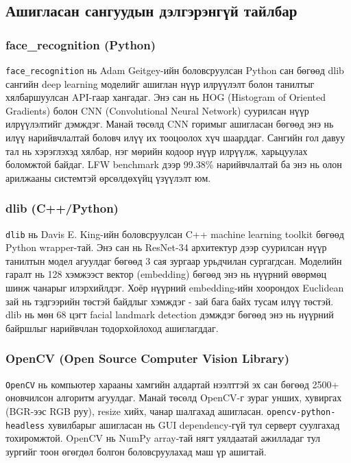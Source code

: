 \documentclass[12pt,a4paper]{article}
\begin{document}
\subsection{Ашигласан сангуудын дэлгэрэнгүй тайлбар}

\subsubsection{face\_recognition (Python)}

\texttt{face\_recognition} нь Adam Geitgey-ийн боловсруулсан Python сан бөгөөд dlib сангийн deep learning моделийг ашиглан нүүр илрүүлэлт болон танилтыг хялбаршуулсан API-гаар хангадаг. Энэ сан нь HOG (Histogram of Oriented Gradients) болон CNN (Convolutional Neural Network) суурилсан нүүр илрүүлэлтийг дэмждэг. Манай төсөлд CNN горимыг ашигласан бөгөөд энэ нь илүү нарийвчлалтай боловч илүү их тооцоолох хүч шаарддаг. Сангийн гол давуу тал нь хэрэглэхэд хялбар, нэг мөрийн кодоор нүүр илрүүлж, харьцуулах боломжтой байдаг. LFW benchmark дээр 99.38\% нарийвчлалтай ба энэ нь олон арилжааны системтэй өрсөлдөхүйц үзүүлэлт юм.

\subsubsection{dlib (C++/Python)}

\texttt{dlib} нь Davis E. King-ийн боловсруулсан C++ machine learning toolkit бөгөөд Python wrapper-тай. Энэ сан нь ResNet-34 архитектур дээр суурилсан нүүр танилтын модел агуулдаг бөгөөд 3 сая зургаар урьдчилан сургагдсан. Моделийн гаралт нь 128 хэмжээст вектор (embedding) бөгөөд энэ нь нүүрний өвөрмөц шинж чанарыг илэрхийлдэг. Хоёр нүүрний embedding-ийн хоорондох Euclidean зай нь тэдгээрийн төстэй байдлыг хэмждэг - зай бага байх тусам илүү төстэй. dlib нь мөн 68 цэгт facial landmark detection дэмждэг бөгөөд энэ нь нүүрний байршлыг нарийвчлан тодорхойлоход ашиглагддаг.

\subsubsection{OpenCV (Open Source Computer Vision Library)}

\texttt{OpenCV} нь компьютер харааны хамгийн алдартай нээлттэй эх сан бөгөөд 2500+ оновчилсон алгоритм агуулдаг. Манай төсөлд OpenCV-г зураг унших, хувиргах (BGR-ээс RGB руу), resize хийх, чанар шалгахад ашигласан. \texttt{opencv-python-headless} хувилбарыг ашигласан нь GUI dependency-гүй тул серверт суулгахад тохиромжтой. OpenCV нь NumPy array-тай нягт уялдаатай ажилладаг тул зургийг тоон өгөгдөл болгон боловсруулахад маш үр ашигтай.
\end{document}
